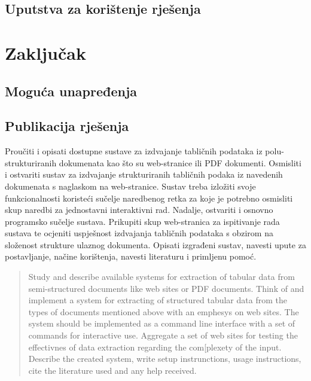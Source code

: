 \documentclass[times, utf8, zavrsni]{fer}
\begin{document}
\section{Uputstva za korištenje rješenja}



\chapter{Zaključak}

\section{Moguća unapređenja}

\section{Publikacija rješenja}






\begin{sazetak}

Proučiti i opisati dostupne sustave za izdvajanje tabličnih podataka iz
polu-strukturiranih dokumenata kao što su web-stranice ili PDF dokumenti.
Osmisliti i ostvariti sustav za izdvajanje strukturiranih tabličnih podaka iz
navedenih dokumenata s naglaskom na web-stranice.
Sustav treba izložiti svoje funkcionalnosti koristeći sučelje naredbenog retka
za koje je potrebno osmisliti skup naredbi za jednostavni interaktivni rad.
Nadalje, ostvariti i osnovno programsko sučelje sustava. Prikupiti skup
web-stranica za ispitivanje rada sustava te ocjeniti uspješnost izdvajanja
tabličnih podataka s obzirom na složenost strukture ulaznog dokumenta. Opisati
izgrađeni sustav, navesti upute za postavljanje, načine korištenja, navesti
literaturu i primljenu pomoć.

\kljucnerijeci{}
\end{sazetak}

\begin{abstract}

Study and describe available systems for extraction of tabular data from
semi-structured documents like web sites or PDF documents. Think of and
implement a system for extracting of structured tabular data from the types of
documents mentioned above with an emphesys on web sites.
The system should be implemented as a command line interface with a set of
commands for interactive use. Aggregate a set of web sites for testing the
effectivnes of data extraction regarding the com[plexety of the input.
Describe the created system, write setup instrunctions, usage instructions,
cite the literature used and any help received.

\keywords{}
\end{abstract}
\end{document}
